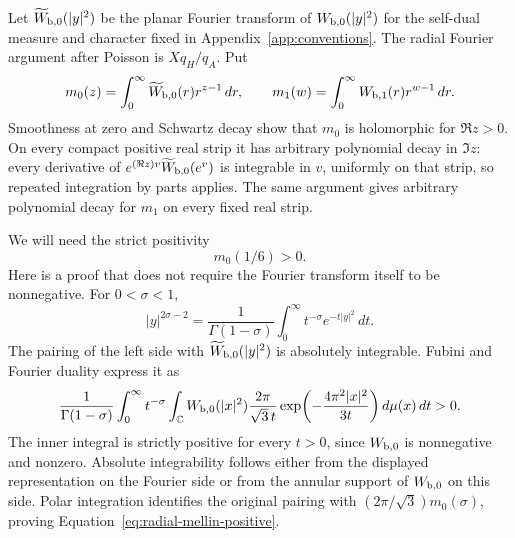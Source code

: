 \documentclass[12pt]{article}
\begin{document}
Let $\widetilde W_{\rm b,0}(|y|^2)$ be the planar Fourier transform of
$W_{\rm b,0}(|y|^2)$ for the self-dual measure and character fixed in
Appendix~\ref{app:conventions}.  The radial Fourier argument after
Poisson is $Xq_H/q_A$.  Put
\[
 m_0(z)=\int_0^\infty\widetilde W_{\rm b,0}(r)r^{z-1}\,dr,
 \qquad
 m_1(w)=\int_0^\infty W_{\rm b,1}(r)r^{w-1}\,dr.
\]
Smoothness at zero and Schwartz decay show that $m_0$ is holomorphic
for $\Re z>0$.  On every compact positive real strip it has
arbitrary polynomial decay in $\Im z$: every derivative of
$e^{(\Re z)v}\widetilde W_{\rm b,0}(e^v)$ is integrable in $v$, uniformly
on that strip, so repeated integration by parts applies.  The same
argument gives arbitrary polynomial decay for $m_1$ on
every fixed real strip.

We will need the strict positivity
\begin{equation}\label{eq:radial-mellin-positive}
 m_0(1/6)>0.
\end{equation}
Here is a proof that does not require the Fourier transform itself
to be nonnegative.  For $0<\sigma<1$,
\[
 |y|^{2\sigma-2}=\frac1{\Gamma(1-\sigma)}
             \int_0^\infty t^{-\sigma}e^{-t|y|^2}\,dt.
\]
The pairing of the left side with $\widetilde W_{\rm b,0}(|y|^2)$ is
absolutely integrable.  Fubini and Fourier duality express it as
\[
 \frac1{\Gamma(1-\sigma)}\int_0^\infty t^{-\sigma}
 \int_{\mathbb C}W_{\rm b,0}(|x|^2)
       \frac{2\pi}{\sqrt3\,t}
       \exp\!\left(-\frac{4\pi^2|x|^2}{3t}\right)
                  d\mu(x)\,dt>0.
\]
The inner integral is strictly positive for every $t>0$, since
$W_{\rm b,0}$ is nonnegative and nonzero.  Absolute integrability follows
either from the displayed representation on the Fourier side or
from the annular support of $W_{\rm b,0}$ on this side.  Polar integration
identifies the original pairing with $(2\pi/\sqrt3)m_0(\sigma)$,
proving Equation~\eqref{eq:radial-mellin-positive}.
\end{document}

